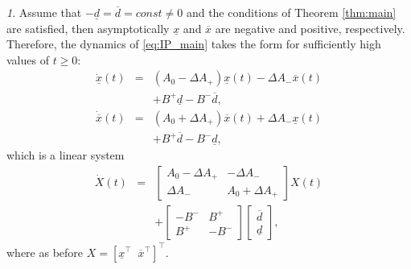 \documentclass[letterpaper, 10 pt, conference]{ieeeconf}
\theoremstyle{plain}
\theoremstyle{definition}
\theoremstyle{plain}
\theoremstyle{plain}
\theoremstyle{remark}
\newtheorem{rem}{\protect\remarkname}
\providecommand{\remarkname}{Remark}
\begin{document}
\begin{rem}
Assume that $-\underline{d}=\overline{d}=const\ne0$ and the conditions of Theorem \ref{thm:main} are satisfied, then asymptotically $\underline{x}$ and $\overline{x}$ are negative and positive, respectively. Therefore, the dynamics of \eqref{eq:IP_main} takes the form for sufficiently high values of $t\geq0$:
\begin{eqnarray*}
\dot{\underline{x}}(t) & = & (A_{0}-\Delta A_{+})\underline{x}(t)-\Delta A_{-}\overline{x}(t)\\
 &  & +B^{+}\underline{d}-B^{-}\overline{d},\\
\dot{\overline{x}}(t) & = & (A_{0}+\Delta A_{+})\overline{x}(t)+\Delta A_{-}\underline{x}(t)\\
 &  & +B^{+}\overline{d}-B^{-}\underline{d},
\end{eqnarray*}
which is a linear system
\begin{eqnarray}
\label{eq:linear-asympt}
\dot{X}(t) & = & \left[\begin{array}{cc}
A_{0}-\Delta A_{+} & -\Delta A_{-}\\
\Delta A_{-} & A_{0}+\Delta A_{+}
\end{array}\right]X(t)\\
 &  & +\left[\begin{array}{cc}
-B^{-} & B^{+}\\
B^{+} & -B^{-}
\end{array}\right]\left[\begin{array}{c}
\overline{d}\\
\underline{d}
\end{array}\right],
\end{eqnarray}
where as before $X=[\underline{x}^{\top}\;\;\overline{x}^{\top}]^{\top}$.
\end{rem}
\end{document}
